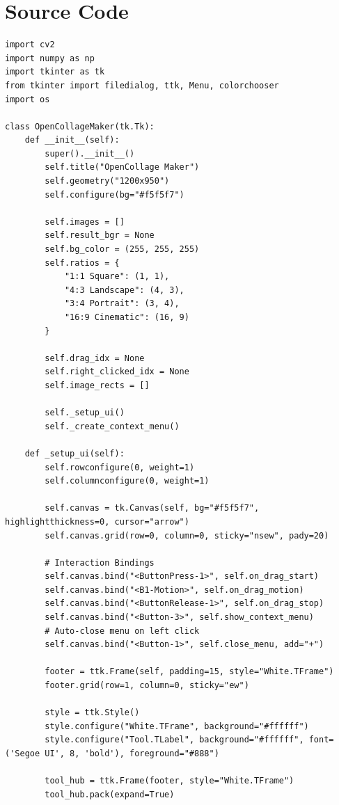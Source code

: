 \documentclass[a4paper]{article}
\begin{document}
\section*{Source Code}
\begin{verbatim}
import cv2
import numpy as np
import tkinter as tk
from tkinter import filedialog, ttk, Menu, colorchooser
import os

class OpenCollageMaker(tk.Tk):
    def __init__(self):
        super().__init__()
        self.title("OpenCollage Maker")
        self.geometry("1200x950")
        self.configure(bg="#f5f5f7")
        
        self.images = [] 
        self.result_bgr = None
        self.bg_color = (255, 255, 255) 
        self.ratios = {
            "1:1 Square": (1, 1),
            "4:3 Landscape": (4, 3),
            "3:4 Portrait": (3, 4),
            "16:9 Cinematic": (16, 9)
        }
        
        self.drag_idx = None
        self.right_clicked_idx = None
        self.image_rects = [] 
        
        self._setup_ui()
        self._create_context_menu()

    def _setup_ui(self):
        self.rowconfigure(0, weight=1)
        self.columnconfigure(0, weight=1)
        
        self.canvas = tk.Canvas(self, bg="#f5f5f7", highlightthickness=0, cursor="arrow")
        self.canvas.grid(row=0, column=0, sticky="nsew", pady=20)
        
        # Interaction Bindings
        self.canvas.bind("<ButtonPress-1>", self.on_drag_start)
        self.canvas.bind("<B1-Motion>", self.on_drag_motion)
        self.canvas.bind("<ButtonRelease-1>", self.on_drag_stop)
        self.canvas.bind("<Button-3>", self.show_context_menu)
        # Auto-close menu on left click
        self.canvas.bind("<Button-1>", self.close_menu, add="+")

        footer = ttk.Frame(self, padding=15, style="White.TFrame")
        footer.grid(row=1, column=0, sticky="ew")
        
        style = ttk.Style()
        style.configure("White.TFrame", background="#ffffff")
        style.configure("Tool.TLabel", background="#ffffff", font=('Segoe UI', 8, 'bold'), foreground="#888")

        tool_hub = ttk.Frame(footer, style="White.TFrame")
        tool_hub.pack(expand=True)


\end{verbatim}
\end{document}
